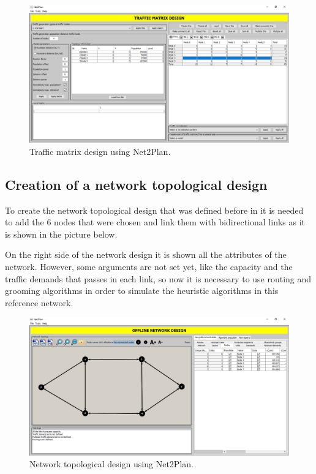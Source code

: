 \begin{figure}[h!]
\centering
\includegraphics[width=12cm]{sdf/heuristic/figures/traffic_matrix_design}
\caption{Traffic matrix design using Net2Plan.}
\label{traffic_matrix_design}
\end{figure}

\subsection{Creation of a network topological design}\label{creation_topological_design}

\vspace{11pt}
To create the network topological design that was defined before in \label{creation_traffic_matrices} it is needed to add the 6 nodes that were chosen and link them with bidirectional links as it is shown in the picture \label{network_topological_design} below.

On the right side of the network design it is shown all the attributes of the network. However, some arguments are not set yet, like the capacity and the traffic demands that passes in each link, so now it is necessary to use routing and grooming algorithms in order to simulate the heuristic algorithms in this reference network.

\begin{figure}[h!]
\centering
\includegraphics[width=12cm]{sdf/heuristic/figures/network_topological_design}
\caption{Network topological design using Net2Plan.}
\label{network_topological_design}
\end{figure}

